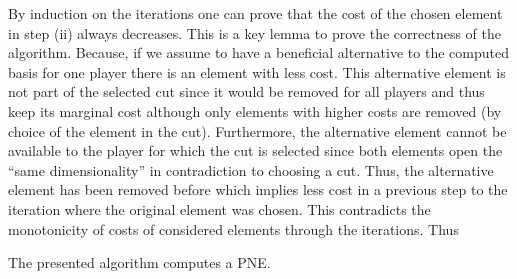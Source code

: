 \documentclass{scrartcl}
\theoremstyle{nonumberplain}
\begin{document}
By induction on the iterations one can prove that the cost of the chosen
element in step (ii) always decreases. This is a key lemma to prove the
correctness of the algorithm. Because, if we assume to have a beneficial
alternative to the computed basis for one player there is an element with
less cost. This alternative element is not part of the selected cut since
it would be removed for all players and thus keep its marginal cost although
only elements with higher costs are removed (by choice of the element in the
cut). Furthermore, the alternative element cannot be available to the player
for which the cut is selected since both elements open the
\enquote{same dimensionality} in contradiction to choosing a cut. Thus, the
alternative element has been removed before which implies less cost in a
previous step to the iteration where the original element was chosen. This
contradicts the monotonicity of costs of considered elements through the
iterations. Thus
\begin{theo}
  The presented algorithm computes a PNE.
\end{theo}
\end{document}
